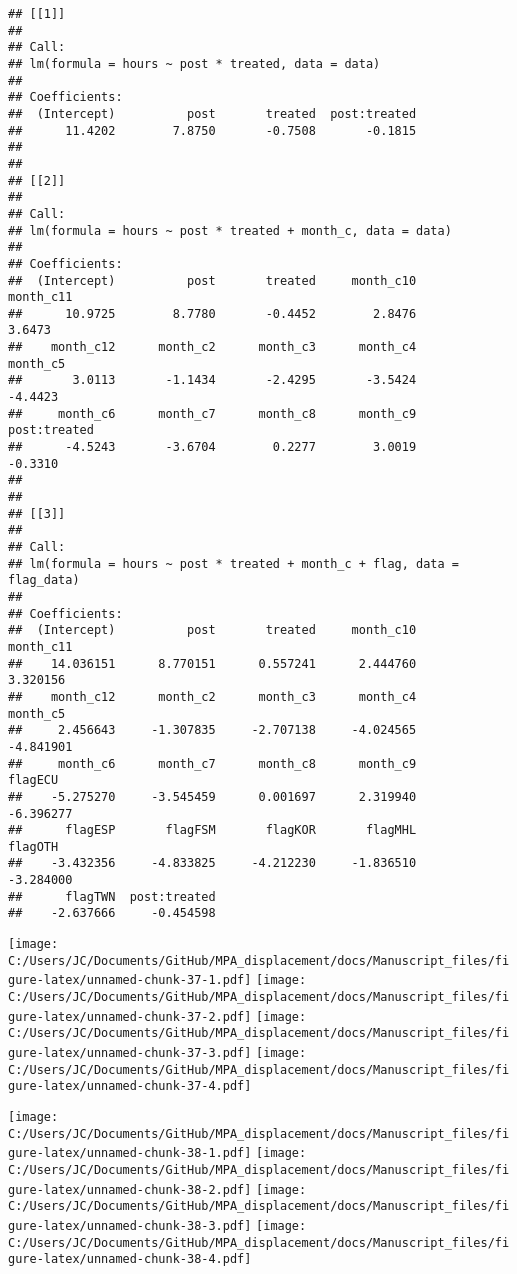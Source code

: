 \documentclass[12pt,]{article}
\begin{document}
\begin{verbatim}
## [[1]]
## 
## Call:
## lm(formula = hours ~ post * treated, data = data)
## 
## Coefficients:
##  (Intercept)          post       treated  post:treated  
##      11.4202        7.8750       -0.7508       -0.1815  
## 
## 
## [[2]]
## 
## Call:
## lm(formula = hours ~ post * treated + month_c, data = data)
## 
## Coefficients:
##  (Intercept)          post       treated     month_c10     month_c11  
##      10.9725        8.7780       -0.4452        2.8476        3.6473  
##    month_c12      month_c2      month_c3      month_c4      month_c5  
##       3.0113       -1.1434       -2.4295       -3.5424       -4.4423  
##     month_c6      month_c7      month_c8      month_c9  post:treated  
##      -4.5243       -3.6704        0.2277        3.0019       -0.3310  
## 
## 
## [[3]]
## 
## Call:
## lm(formula = hours ~ post * treated + month_c + flag, data = flag_data)
## 
## Coefficients:
##  (Intercept)          post       treated     month_c10     month_c11  
##    14.036151      8.770151      0.557241      2.444760      3.320156  
##    month_c12      month_c2      month_c3      month_c4      month_c5  
##     2.456643     -1.307835     -2.707138     -4.024565     -4.841901  
##     month_c6      month_c7      month_c8      month_c9       flagECU  
##    -5.275270     -3.545459      0.001697      2.319940     -6.396277  
##      flagESP       flagFSM       flagKOR       flagMHL       flagOTH  
##    -3.432356     -4.833825     -4.212230     -1.836510     -3.284000  
##      flagTWN  post:treated  
##    -2.637666     -0.454598
\end{verbatim}

\texttt{[image: C:/Users/JC/Documents/GitHub/MPA\_displacement/docs/Manuscript\_files/figure-latex/unnamed-chunk-37-1.pdf]}
\texttt{[image: C:/Users/JC/Documents/GitHub/MPA\_displacement/docs/Manuscript\_files/figure-latex/unnamed-chunk-37-2.pdf]}
\texttt{[image: C:/Users/JC/Documents/GitHub/MPA\_displacement/docs/Manuscript\_files/figure-latex/unnamed-chunk-37-3.pdf]}
\texttt{[image: C:/Users/JC/Documents/GitHub/MPA\_displacement/docs/Manuscript\_files/figure-latex/unnamed-chunk-37-4.pdf]}

\texttt{[image: C:/Users/JC/Documents/GitHub/MPA\_displacement/docs/Manuscript\_files/figure-latex/unnamed-chunk-38-1.pdf]}
\texttt{[image: C:/Users/JC/Documents/GitHub/MPA\_displacement/docs/Manuscript\_files/figure-latex/unnamed-chunk-38-2.pdf]}
\texttt{[image: C:/Users/JC/Documents/GitHub/MPA\_displacement/docs/Manuscript\_files/figure-latex/unnamed-chunk-38-3.pdf]}
\texttt{[image: C:/Users/JC/Documents/GitHub/MPA\_displacement/docs/Manuscript\_files/figure-latex/unnamed-chunk-38-4.pdf]}

\clearpage


\end{document}
